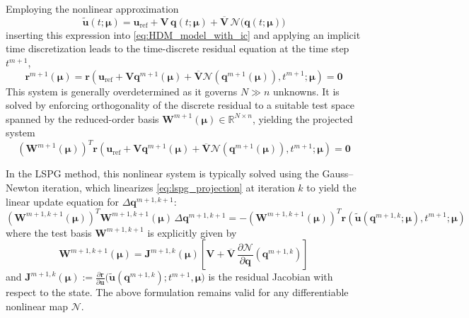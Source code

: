 \documentclass[preprint,10pt]{elsarticle}
\begin{document}
Employing the nonlinear approximation
\[
  \tilde{\mathbf u}(t;\boldsymbol\mu)
  =\mathbf u_{\mathrm{ref}}
   +\mathbf V\,\mathbf q(t;\boldsymbol\mu)
   +\overline{\mathbf V}\,\mathcal N\bigl(\mathbf q(t;\boldsymbol\mu)\bigr)
\]
inserting this expression into \eqref{eq:HDM_model_with_ic} and applying an implicit time discretization leads to the time-discrete residual equation at the time step \( t^{m+1} \),
\begin{equation}
\mathbf{r}^{m+1}(\boldsymbol\mu)
= \mathbf{r}\left( \mathbf{u}_{\mathrm{ref}} + \mathbf{V} \mathbf{q}^{m+1}(\boldsymbol\mu) + \overline{\mathbf{V}} \mathcal{N}(\mathbf{q}^{m+1}(\boldsymbol\mu)), t^{m+1}; \boldsymbol\mu \right)
= \mathbf{0}
\label{eq:discrete_rom_residual}
\end{equation}
This system is generally overdetermined as it governs \(N \gg n\) unknowns. It is solved by enforcing orthogonality of the discrete residual to a suitable test space spanned by the reduced-order basis \(\mathbf{W}^{m+1}(\boldsymbol\mu) \in \mathbb{R}^{N \times n}\), yielding the projected system
\begin{equation}
\left(\mathbf{W}^{m+1}(\boldsymbol\mu)\right)^T \mathbf{r}\left( \mathbf{u}_{\mathrm{ref}} + \mathbf{V} \mathbf{q}^{m+1}(\boldsymbol\mu) + \overline{\mathbf{V}} \mathcal{N}(\mathbf{q}^{m+1}(\boldsymbol\mu)), t^{m+1}; \boldsymbol\mu \right)
= \mathbf{0}
\label{eq:lspg_projection}
\end{equation}

In the LSPG method, this nonlinear system is typically solved using the Gauss--Newton iteration, which linearizes \eqref{eq:lspg_projection} at iteration \(k\) to yield the linear update equation for \(\Delta \mathbf q^{m+1,k+1}\):
\begin{equation}
\left(
\mathbf W^{m+1,k+1}(\boldsymbol\mu)
\right)^{\!\!T}
\mathbf W^{m+1,k+1}(\boldsymbol\mu)
\,\Delta\mathbf q^{m+1,k+1}
=
-\left(
\mathbf W^{m+1,k+1}(\boldsymbol\mu)
\right)^{\!\!T}
\mathbf r\!\left(
\tilde{\mathbf u}(\mathbf q^{m+1,k};\boldsymbol\mu), t^{m+1}; \boldsymbol\mu
\right)
\label{eq:lspg_gn_system}
\end{equation}
where the test basis \(\mathbf W^{m+1,k+1}\) is explicitly given by
\begin{equation}
\mathbf W^{m+1,k+1}(\boldsymbol\mu)
=
\mathbf J^{m+1,k}(\boldsymbol\mu)
\left[
\mathbf V+\overline{\mathbf V}
\,\frac{\partial \mathcal N}{\partial \mathbf q}(\mathbf q^{m+1,k})
\right]
\label{eq:lspg_basis_summary}
\end{equation}
and \(\mathbf J^{m+1,k}(\boldsymbol\mu) := \frac{\partial \mathbf r}{\partial \mathbf u}\bigl(\tilde{\mathbf u}(\mathbf q^{m+1,k}); t^{m+1}, \boldsymbol\mu\bigr)\) is the residual Jacobian with respect to the state. The above formulation remains valid for any differentiable nonlinear map \(\mathcal{N}\).
\end{document}
